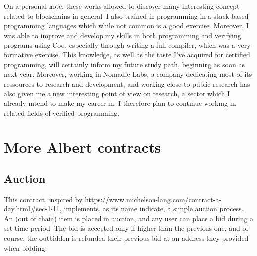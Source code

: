 \documentclass{report}
\begin{document}
On a personal note, these works allowed to discover many interesting concept related to blockchains in general. I also trained in programming in a stack-based programming languages which while not common is a good exercise. Moreover, I was able to improve and develop my skills in both programming and verifying programs using Coq, especially through writing a full compiler, which was a very formative exercise. This knowledge, as well as the taste I've acquired for certified programming, will certainly inform my future study path, beginning as soon as next year. Moreover, working in Nomadic Labs, a company dedicating most of its ressources to research and development, and working close to public research has also given me a new interesting point of view on research, a sector which I already intend to make my career in. I therefore plan to continue working in related fields of verified programming.

\appendix

\chapter{More Albert contracts}
\label{appendix:moreAlbert}

\section{Auction}

This contract, inspired by \url{https://www.michelson-lang.com/contract-a-day.html#sec-1-11}, implements, as its name indicate, a simple auction process. An (out of chain) item is placed in auction, and any user can place a bid during a set time period. The bid is accepted only if higher than the previous one, and of course, the outbidden is refunded their previous bid at an address they provided when bidding.
\end{document}
